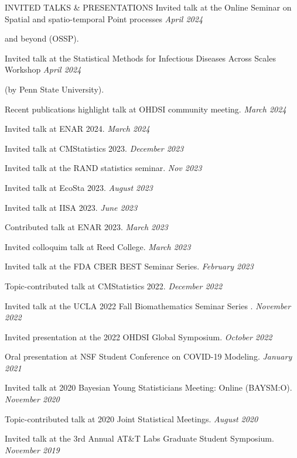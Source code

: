 \documentclass{resume} %
\begin{document}
\begin{rSection}{INVITED TALKS \& PRESENTATIONS}
	Invited talk at the Online Seminar on Spatial and spatio-temporal Point processes   \hfill {\em April 2024}
	
	\vspace{-0.1in} 
	and beyond (OSSP).
	
	Invited talk at the Statistical Methods for Infectious Diseases Across Scales Workshop \hfill {\em April 2024}
	
	\vspace{-0.1in}
	(by Penn State University).
	
	Recent publications highlight talk at OHDSI community meeting. \hfill {\em March 2024}
	
	Invited talk at ENAR 2024.  \hfill {\em March 2024}
	
	Invited talk at CMStatistics 2023. \hfill {\em December 2023}
	
	Invited talk at the RAND statistics seminar. \hfill {\em Nov 2023}
	
	Invited talk at EcoSta 2023. \hfill {\em August 2023}
	
	Invited talk at IISA 2023.  \hfill {\em June 2023}
	
	
	Contributed talk at ENAR 2023. \hfill {\em March 2023}
	
	Invited colloquim talk at Reed College. \hfill {\em March 2023}
	
	Invited talk at the FDA CBER BEST Seminar Series. \hfill {\em February 2023}
	
	Topic-contributed talk at CMStatistics 2022. \hfill {\em December 2022}
	
	Invited talk at the UCLA 2022 Fall Biomathematics Seminar Series . \hfill {\em November 2022}
	
	Invited presentation at the 2022 OHDSI Global Symposium.  \hfill {\em October 2022}
	
	{Oral presentation at NSF Student Conference on COVID-19 Modeling.} \hfill {\em January 2021}
	
	{Invited talk at 2020 Bayesian Young Statisticians Meeting: Online (BAYSM:O).} \hfill {\em November 2020}
	
	{Topic-contributed talk at 2020 Joint Statistical Meetings. } \hfill {\em August 2020}
	
	{Invited talk at the 3rd Annual AT\&T Labs Graduate Student Symposium.} \hfill {\em November 2019}
	

\end{rSection}
\end{document}
